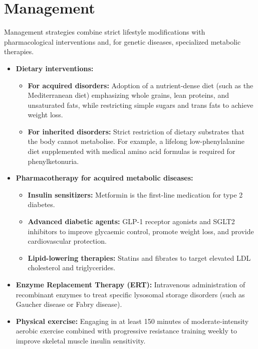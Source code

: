 \section*{Management}
Management strategies combine strict lifestyle modifications with pharmacological interventions and, for genetic diseases, specialized metabolic therapies.
\begin{itemize}
    \item \textbf{Dietary interventions:}
        \begin{itemize}
            \item \textbf{For acquired disorders:} Adoption of a nutrient-dense diet (such as the Mediterranean diet) emphasizing whole grains, lean proteins, and unsaturated fats, while restricting simple sugars and trans fats to achieve weight loss.
            \item \textbf{For inherited disorders:} Strict restriction of dietary substrates that the body cannot metabolise. For example, a lifelong low-phenylalanine diet supplemented with medical amino acid formulas is required for phenylketonuria.
        \end{itemize}
    \item \textbf{Pharmacotherapy for acquired metabolic diseases:}
        \begin{itemize}
            \item \textbf{Insulin sensitizers:} Metformin is the first-line medication for type 2 diabetes.
            \item \textbf{Advanced diabetic agents:} GLP-1 receptor agonists and SGLT2 inhibitors to improve glycaemic control, promote weight loss, and provide cardiovascular protection.
            \item \textbf{Lipid-lowering therapies:} Statins and fibrates to target elevated LDL cholesterol and triglycerides.
        \end{itemize}
    \item \textbf{Enzyme Replacement Therapy (ERT):} Intravenous administration of recombinant enzymes to treat specific lysosomal storage disorders (such as Gaucher disease or Fabry disease).
    \item \textbf{Physical exercise:} Engaging in at least 150 minutes of moderate-intensity aerobic exercise combined with progressive resistance training weekly to improve skeletal muscle insulin sensitivity.
\end{itemize}

